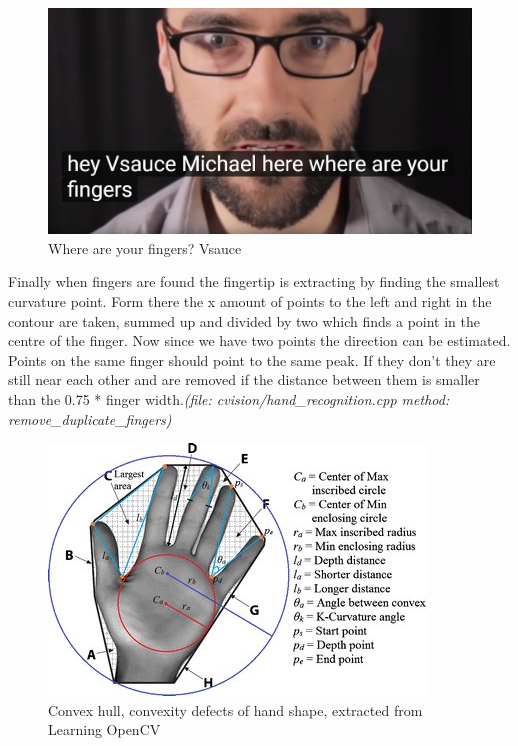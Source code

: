 \documentclass[11pt,a4paper]{article}
\begin{document}
\begin{figure}
\begin{center}
\includegraphics[scale=0.3]{fingers}
\end{center}
\caption{Where are your fingers? Vsauce}
\label{fig:fingers}
\end{figure}

Finally when fingers are found the fingertip is extracting by finding the smallest curvature point. Form there the x amount of points to the left and right in the contour are taken, summed up and divided by two which finds a point in the centre of the finger. Now since we have two points the direction can be estimated. Points on the same finger should point to the same peak. If they don't they are still near each other and are removed if the distance between them is smaller than the 0.75 * finger width.\textit{(file: cvision/hand\_recognition.cpp method: remove\_duplicate\_fingers)}

\begin{figure}
\begin{center}
\includegraphics{hand_fingers}
\end{center}
\caption{Convex hull, convexity defects of hand shape, extracted from \citep{Yeo2015} Learning OpenCV}
\label{fig:histogram}
\end{figure}
\end{document}

